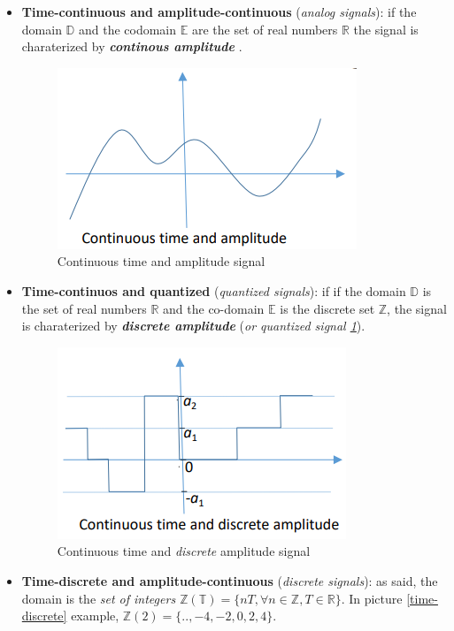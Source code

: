 \documentclass[10pt,a4paper]{report}
\theoremstyle{definition}
\begin{document}
\begin{itemize}
	\item 
	\textbf{Time-continuous and amplitude-continuous} (\textit{analog signals}): if the domain $\mathbb{D}$ and the codomain $\mathbb{E}$ are the set of real numbers $\mathbb{R}$ the signal is charaterized by \textit{\textbf{continous amplitude}} .
 
	\begin{figure}[h]
		\centering\includegraphics[scale=0.50]{images/Pasted image 20230503163054.png}
		\caption{Continuous time and amplitude signal}
	\end{figure}
	
	\item 
	\textbf{Time-continuos and quantized}  (\textit{quantized signals}):  if  if the domain $\mathbb{D}$ is  the set of real numbers $\mathbb{R}$ and the co-domain $\mathbb{E}$ is the discrete set $\mathbb{Z}$, the signal is charaterized by \textit{\textbf{discrete amplitude}} (\textit{or quantized signal \ref{quantized-signal}}). 
	\begin{figure}[h]
		\centering\includegraphics[scale=0.50]{images/Pasted image 20230503163114.png}
		\caption{Continuous time and \textit{discrete} amplitude signal}
		\label{quantized-signal}
	\end{figure}
	
	\item 
	\textbf{Time-discrete and amplitude-continuous} (\textit{discrete signals}): as said, the domain is the \textit{set of integers $\mathbb{Z(T)} = \{nT, \forall n \in \mathbb{Z}, T \in \mathbb{R}\}$}. In picture \ref{time-discrete} example, $\mathbb{Z}(2) = \{..,-4,-2,0,2,4\}$.
	 

\end{itemize}
\end{document}
